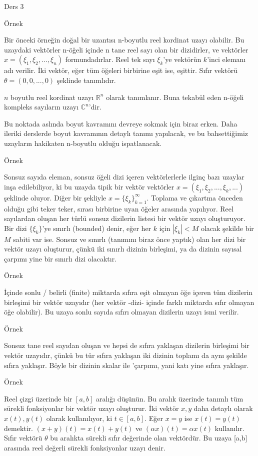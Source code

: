 \documentclass[12pt,fleqn]{article}\usepackage{../../common}
\begin{document}
Ders 3

Örnek 

Bir önceki örneğin doğal bir uzantısı n-boyutlu reel kordinat uzayı
olabilir. Bu uzaydaki vektörler n-öğeli içinde n tane reel sayı olan bir
dizidirler, ve vektörler $x = (\xi_1, \xi_2,...,\xi_n)$
formundadırlar. Reel tek sayı $\xi_k$'ye vektörün $k$'inci elemanı adı
verilir. İki vektör, eğer tüm öğeleri birbirine eşit ise, eşittir. Sıfır
vektörü $\theta = (0,0,...,0)$ şeklinde tanımlıdır. 

$n$ boyutlu reel kordinat uzayı $\mathbb{R}^n$ olarak tanımlanır. Buna
tekabül eden n-öğeli kompleks sayıların uzayı $\mathbb{C}^n$'dir.

Bu noktada aslında boyut kavramını devreye sokmak için biraz erken. Daha
ileriki derslerde boyut kavramının detaylı tanımı yapılacak, ve bu
bahsettiğimiz uzayların hakikaten n-boyutlu olduğu ispatlanacak.

Örnek 

Sonsuz sayıda eleman, sonsuz öğeli dizi içeren vektörlerlerle ilginç bazı
uzaylar inşa edilebiliyor, ki bu uzayda tipik bir vektör vektörler
$x = (\xi_1, \xi_2,...,\xi_k,...)$ şeklinde oluyor. Diğer bir şekliyle
$x = \{\xi_k\} _{k=1}^{\infty}$.  Toplama ve çıkartma önceden olduğu gibi
teker teker, sırası birbirine uyan öğeler arasında yapılıyor. Reel
sayılardan oluşan her türlü sonsuz dizilerin listesi bir vektör uzayı
oluşturuyor. Bir dizi $\{\xi_k\}$'ye sınırlı (bounded) denir, eğer her $k$
için $|\xi_k| < M$ olacak şekilde bir $M$ sabiti var ise. Sonsuz ve sınırlı
(tanımını biraz önce yaptık) olan her dizi bir vektör uzayı oluşturur,
çünkü iki sınırlı dizinin birleşimi, ya da dizinin sayısal çarpımı yine bir
sınırlı dizi olacaktır.

Örnek 

İçinde sonlu / belirli (finite) miktarda sıfıra eşit olmayan öğe içeren tüm
dizilerin birleşimi bir vektör uzayıdır (her vektör -dizi- içinde farklı
miktarda sıfır olmayan öğe olabilir). Bu uzaya sonlu sayıda sıfırı olmayan
dizilerin uzayı ismi verilir. 

Örnek

Sonsuz tane reel sayıdan oluşan ve hepsi de sıfıra yaklaşan dizilerin
birleşimi bir vektör uzayıdır, çünkü bu tür sıfıra yaklaşan iki dizinin
toplamı da aynı şekilde sıfıra yaklaşır. Böyle bir dizinin skalar ile
'çarpımı, yani katı yine sıfıra yaklaşır. 

Örnek 

Reel çizgi üzerinde bir $[a,b]$ aralığı düşünün. Bu aralık üzerinde tanımlı
tüm sürekli fonksiyonlar bir vektör uzayı oluşturur. İki vektör $x,y$ daha
detaylı olarak $x(t),y(t)$ olarak kullanılıyor, ki $t \in [a,b]$. Eğer
$x = y$ ise $x(t) = y(t)$ demektir. $(x+y)(t) = x(t) + y(t)$ ve
$(\alpha x)(t) = \alpha x(t)$ kullanılır. Sıfır vektörü $\theta$ bu
aralıkta sürekli sıfır değerinde olan vektördür.  Bu uzaya [a,b] arasında
reel değerli sürekli fonksiyonlar uzayı denir.
\end{document}
